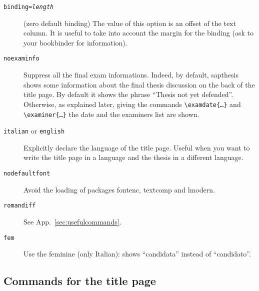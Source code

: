 \documentclass[a5paper,11pt]{article}
\newcommand{\bs}{\textbackslash}
\begin{document}
\begin{description}
\item[\texttt{binding=\textsl{length}}] (zero default binding)
The value of this option is an offset of the text column.
It is useful to take into account the margin for the binding (ask to your bookbinder for information).
\item[\texttt{noexaminfo}] Suppress all the final exam informations. Indeed, by default, \textsf{sapthesis} shows some information about the final thesis discussion on the back of the title page. By default it shows the phrase ``Thesis not yet defended''. Otherwise, as explained later, giving the commands 
\texttt{\bs examdate\{\dots\}} and \texttt{\bs examiner\{\dots\}} the date and
the examiners list are shown.
\item[\texttt{italian} or \texttt{english}] Explicitly declare the language of 
the title page. Useful when you want to write the title page in a language 
and the thesis in a different language.
\item[\texttt{nodefaultfont}] Avoid the loading of packages \textsf{fontenc}, \textsf{textcomp} and \textsf{lmodern}.
\item[\texttt{romandiff}] See App.~\ref{sec:usefulcommands}.
\item[\texttt{fem}] Use the feminine (only Italian): shows ``candidata'' instead of ``candidato''.
\end{description}

\subsection[Commands for the\\ title page]{Commands for the title page}
\label{commands_titlepage}
\end{document}

